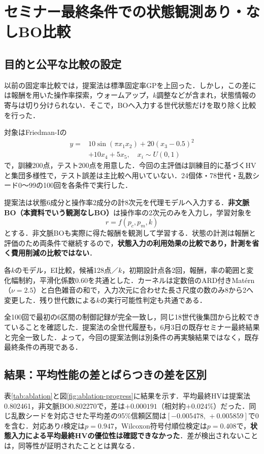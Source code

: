 \documentclass[a4paper,10pt,twocolumn]{ltjsarticle}
\begin{document}
\section{セミナー最終条件での状態観測あり・なしBO比較}
\subsection{目的と公平な比較の設定}
以前の固定率比較では，提案法は標準固定率GPを上回った．しかし，この差には報酬を用いた操作率探索，ウォームアップ，\(k\)調整などが含まれ，状態情報の寄与は切り分けられない．そこで，BOへ入力する世代状態だけを取り除く比較を行った．

対象はFriedman-Iの
\begin{equation}
\begin{aligned}
 y={}&10\sin(\pi x_1x_2)+20(x_3-0.5)^2\\
     &+10x_4+5x_5,\quad x_i\sim U(0,1)
\end{aligned}
\end{equation}
で，訓練200点，テスト200点を用意した．今回の主評価は訓練目的に基づくHVと集団多様性で，テスト誤差は主比較へ用いていない．24個体・78世代・乱数シード0～99の100回を各条件で実行した．

提案法は状態6成分と操作率2成分の計8次元を代理モデルへ入力する．\textbf{非文脈BO（本資料でいう観測なしBO）}は操作率の2次元のみを入力し，学習対象を
\begin{equation}
 r=f(p_c,p_m,k)
\end{equation}
とする．非文脈BOも実際に得た報酬を観測して学習する．状態の計測は報酬と評価のため両条件で継続するので，\textbf{状態入力の利用効果の比較であり，計測を省く費用削減の比較ではない}．

各\(k\)のモデル，EI比較，候補128点／\(k\)，初期設計点各2回，報酬，率の範囲と変化幅制約，平滑化係数0.60を共通とした．カーネルは定数倍のARD付きMat\'ern（\(\nu=2.5\)）と白色雑音の和で，入力次元に合わせた長さ尺度の数のみ8から2へ変更した．残り世代数による\(k\)の実行可能性判定も共通である．

全100回で最初の6区間の制御記録が完全一致し，同じ18世代後集団から比較できていることを確認した．提案法の全世代履歴も，6月3日の既存セミナー最終結果と完全一致した．よって，今回の提案法側は別条件の再実験結果ではなく，既存最終条件の再現である．

\subsection{結果：平均性能の差とばらつきの差を区別}
表\ref{tab:ablation}と図\ref{fig:ablation-progress}に結果を示す．平均最終HVは提案法0.802461，非文脈BO0.802270で，差は\(+0.000191\)（相対約\(+0.024\%\)）だった．同じ乱数シードを対応させた平均差の95\%信頼区間は\([-0.005478,\,+0.005859]\)で0を含む．対応あり\(t\)検定は\(p=0.947\)，Wilcoxon符号付順位検定は\(p=0.408\)で，\textbf{状態入力による平均最終HVの優位性は確認できなかった}．差が検出されないことは，同等性が証明されたこととは異なる．
\end{document}
